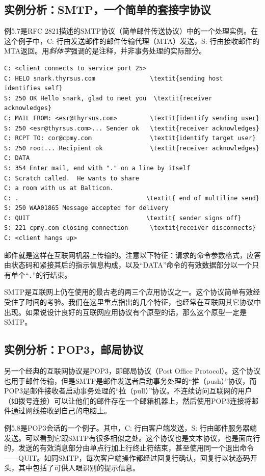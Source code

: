 \documentclass[12pt,oneside]{book}
\begin{document}
\subsection{实例分析：SMTP，一个简单的套接字协议}
例5.7是RFC 2821描述的SMTP协议（简单邮件传送协议）中的一个处理实例。在这个例子中，C: 行由发送邮件的邮件传输代理（MTA）发送，S: 行由接收邮件的MTA返回。用\textit{斜体字}强调的是注释，并非事务处理的实际部分。

\begin{Verbatim}[label=例5.7  SMTP会话实例, commandchars=\\\{\}]
C: <client connects to service port 25>
C: HELO snark.thyrsus.com               \textit{sending host identifies self}
S: 250 OK Hello snark, glad to meet you  \textit{receiver acknowledges}
C: MAIL FROM: <esr@thyrsus.com>         \textit{identify sending user}
S: 250 <esr@thyrsus.com>... Sender ok   \textit{receiver acknowledges}
C: RCPT TO: cor@cpmy.com                \textit{identify target user}
S: 250 root... Recipient ok             \textit{receiver acknowledges}
C: DATA
S: 354 Enter mail, end with "." on a line by itself
C: Scratch called.  He wants to share
C: a room with us at Balticon.
C: .                                   \textit{ end of multiline send}
S: 250 WAA01865 Message accepted for delivery
C: QUIT                                \textit{ sender signs off}
S: 221 cpmy.com closing connection      \textit{receiver disconnects}
C: <client hangs up>
\end{Verbatim}

邮件就是这样在互联网机器上传输的。注意以下特征：请求的命令参数格式，应答由状态码和紧接其后的指示信息构成，以及“DATA”命令的有效数据部分以一个只有单个“．”的行结束。

SMTP是互联网上仍在使用的最古老的两三个应用协议之一。这个协议简单有效经受住了时间的考验。我们在这里重点指出的几个特征，也经常在互联网其它协议中出现。如果说设计良好的互联网应用协议有个原型的话，那么这个原型一定是SMTP。

\subsection{实例分析：POP3，邮局协议}
另一个经典的互联网协议是POP3，即邮局协议（Post Office Protocol）。这个协议也用于邮件传输，但是SMTP是邮件发送者启动事务处理的“推（push）”协议，而POP3是邮件接收者启动事务处理的“拉（pull）”协议。不连续访问互联网的用户（如拨号连接）可以让他们的邮件存在一个邮箱机器上，然后使用POP3连接将邮件通过网线接收到自己的电脑上。

例5.8是POP3会话的一个例子。其中，C: 行由客户端发送，S: 行由邮件服务器端发送。可以看到它跟SMTP有很多相似之处。这个协议也是文本协议，也是面向行的，发送的有效消息部分由单点行加上行终止符结束，甚至使用同一个退出命令——QUIT。如同SMTP，每次客户端操作都经过回复行确认，回复行以状态码开头，其中包括了可供人眼识别的提示信息。
\end{document}
